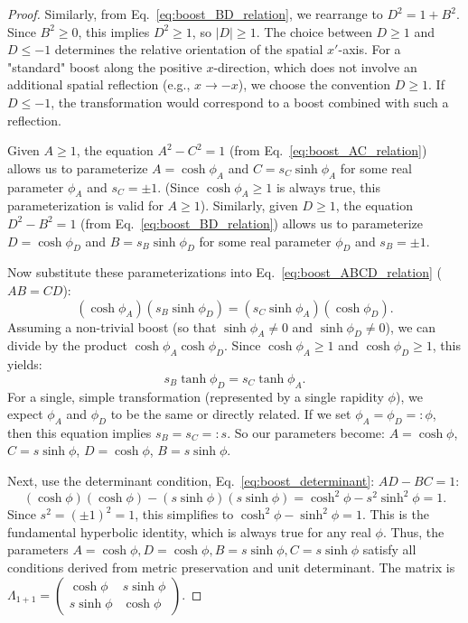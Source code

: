 \documentclass{amsart}
\theoremstyle{definition}
\theoremstyle{remark}
\begin{document}
\begin{proof}
  Similarly, from Eq.~\eqref{eq:boost_BD_relation}, we rearrange to $D^2 = 1 + B^2$. Since $B^2 \geq 0$, this implies $D^2 \geq 1$, so $|D| \geq 1$.
  The choice between $D \geq 1$ and $D \leq -1$ determines the relative orientation of the spatial $x'$-axis. For a "standard" boost along the positive $x$-direction, which does not involve an additional spatial reflection (e.g., $x \to -x$), we choose the convention $D \geq 1$. If $D \leq -1$, the transformation would correspond to a boost combined with such a reflection.

  Given $A \geq 1$, the equation $A^2 - C^2 = 1$ (from Eq.~\eqref{eq:boost_AC_relation}) allows us to parameterize $A = \cosh\phi_A$ and $C = s_C \sinh\phi_A$ for some real parameter $\phi_A$ and $s_C = \pm 1$. (Since $\cosh\phi_A \ge 1$ is always true, this parameterization is valid for $A \ge 1$).
  Similarly, given $D \geq 1$, the equation $D^2 - B^2 = 1$ (from Eq.~\eqref{eq:boost_BD_relation}) allows us to parameterize $D = \cosh\phi_D$ and $B = s_B \sinh\phi_D$ for some real parameter $\phi_D$ and $s_B = \pm 1$.

  Now substitute these parameterizations into Eq.~\eqref{eq:boost_ABCD_relation} ($AB = CD$):
  \[ (\cosh\phi_A)(s_B \sinh\phi_D) = (s_C \sinh\phi_A)(\cosh\phi_D). \]
  Assuming a non-trivial boost (so that $\sinh\phi_A \neq 0$ and $\sinh\phi_D \neq 0$), we can divide by the product $\cosh\phi_A \cosh\phi_D$. Since $\cosh\phi_A \ge 1$ and $\cosh\phi_D \ge 1$, this yields:
  \[ s_B \tanh\phi_D = s_C \tanh\phi_A. \]
  For a single, simple transformation (represented by a single rapidity $\phi$), we expect $\phi_A$ and $\phi_D$ to be the same or directly related. If we set $\phi_A = \phi_D =: \phi$, then this equation implies $s_B = s_C =: s$.
  So our parameters become: $A = \cosh\phi$, $C = s \sinh\phi$, $D = \cosh\phi$, $B = s \sinh\phi$.

  Next, use the determinant condition, Eq.~\eqref{eq:boost_determinant}: $AD-BC=1$:
  \[ (\cosh\phi)(\cosh\phi) - (s \sinh\phi)(s \sinh\phi) = \cosh^2\phi - s^2 \sinh^2\phi = 1. \]
  Since $s^2 = (\pm 1)^2 = 1$, this simplifies to $\cosh^2\phi - \sinh^2\phi = 1$. This is the fundamental hyperbolic identity, which is always true for any real $\phi$.
  Thus, the parameters $A=\cosh\phi, D=\cosh\phi, B=s\sinh\phi, C=s\sinh\phi$ satisfy all conditions derived from metric preservation and unit determinant.
  The matrix is $\Lambda_{1+1} = \begin{pmatrix} \cosh\phi & s\sinh\phi \\ s\sinh\phi & \cosh\phi \end{pmatrix}$.


\end{proof}
\end{document}
